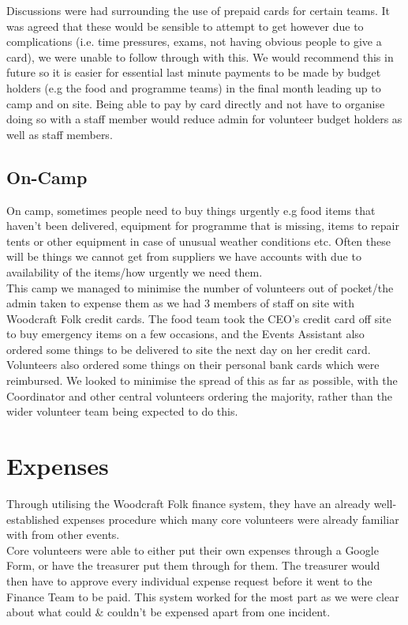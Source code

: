 Discussions were had surrounding the use of prepaid cards for certain teams. It was agreed that these would be sensible to attempt to get however due to complications (i.e. time pressures, exams, not having obvious people to give a card), we were unable to follow through with this. We would recommend this in future so it is easier for essential last minute payments to be made by budget holders (e.g the food and programme teams) in the final month leading up to camp and on site. Being able to pay by card directly and not have to organise doing so with a staff member would reduce admin for volunteer budget holders as well as staff members.

\subsection{On-Camp}
On camp, sometimes people need to buy things urgently e.g food items that haven't been delivered, equipment for programme that is missing, items to repair tents or other equipment in case of unusual weather conditions etc. Often these will be things we cannot get from suppliers we have accounts with due to availability of the items/how urgently we need them.\\

This camp we managed to minimise the number of volunteers out of pocket/the admin taken to expense them as we had 3 members of staff on site with Woodcraft Folk credit cards. The food team took the CEO's credit card off site to buy emergency items on a few occasions, and the Events Assistant also ordered some things to be delivered to site the next day on her credit card.\\

Volunteers also ordered some things on their personal bank cards which were reimbursed. We looked to minimise the spread of this as far as possible, with the Coordinator and other central volunteers ordering the majority, rather than the wider volunteer team being expected to do this.

\section{Expenses}
Through utilising the Woodcraft Folk finance system, they have an already well-established expenses procedure which many core volunteers were already familiar with from other events. \\

Core volunteers were able to either put their own expenses through a Google Form, or have the treasurer put them through for them. The treasurer would then have to approve every individual expense request before it went to the Finance Team to be paid. This system worked for the most part as we were clear about what could \& couldn't be expensed apart from one incident.\\

